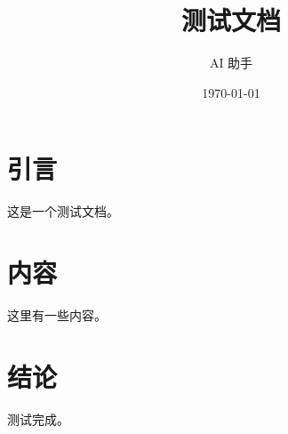 \documentclass{article}
\title{测试文档}
\author{AI 助手}
\date{\today}
\begin{document}
\maketitle

\section{引言}
这是一个测试文档。

\section{内容}
这里有一些内容。

\section{结论}
测试完成。
\end{document}
